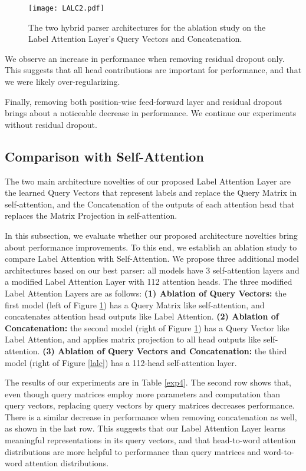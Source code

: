 \documentclass[11pt,a4paper]{article}
\begin{document}
\begin{figure}
    \centering
    \texttt{[image: LALC2.pdf]}
    \caption{The two hybrid parser architectures for the ablation study on the Label Attention Layer's Query Vectors and Concatenation.}\label{lalc2}
\end{figure}

We observe an increase in performance when removing residual dropout only. This suggests that all head contributions are important for performance, and that we were likely over-regularizing.

Finally, removing both position-wise feed-forward layer and residual dropout brings about a noticeable decrease in performance. We continue our experiments without residual dropout.

\subsection{Comparison with Self-Attention}

The two main architecture novelties of our proposed Label Attention Layer are the learned Query Vectors that represent labels and replace the Query Matrix in self-attention, and the Concatenation of the outputs of each attention head that replaces the Matrix Projection in self-attention.

In this subsection, we evaluate whether our proposed architecture novelties bring about performance improvements. To this end, we establish an ablation study to compare Label Attention with Self-Attention. We propose three additional model architectures based on our best parser: all models have 3 self-attention layers and a modified Label Attention Layer with 112 attention heads. The three modified Label Attention Layers are as follows: \textbf{(1) Ablation of Query Vectors:} the first model (left of Figure \ref{lalc2}) has a Query Matrix like self-attention, and concatenates attention head outputs like Label Attention. \textbf{(2) Ablation of Concatenation:} the second model (right of Figure \ref{lalc2}) has a Query Vector like Label Attention, and applies matrix projection to all head outputs like self-attention. \textbf{(3) Ablation of Query Vectors and Concatenation:} the third model (right of Figure \ref{lalc}) has a 112-head self-attention layer.

The results of our experiments are  in Table \ref{exp4}. The second row shows that, even though query matrices employ more parameters and computation than query vectors, replacing query vectors by query matrices decreases performance. There is a similar decrease in performance when removing concatenation as well, as shown in the last row. This suggests that our Label Attention Layer learns meaningful representations in its query vectors, and that head-to-word attention distributions are more helpful to performance than query matrices and word-to-word attention distributions.
\end{document}
